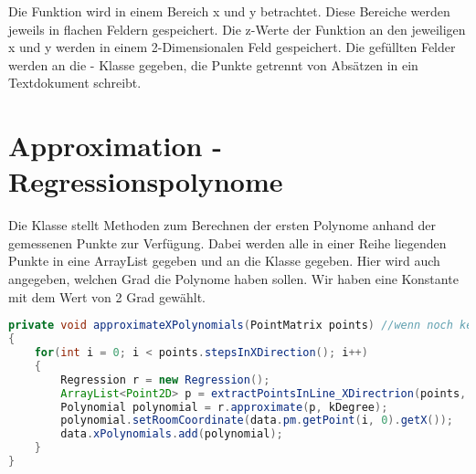 \documentclass[11pt, bibliography=totocnumbered]{scrartcl}
\begin{document}
Die Funktion wird in einem Bereich x und y betrachtet. Diese Bereiche werden jeweils in flachen Feldern gespeichert. Die z-Werte der Funktion an den jeweiligen x und y werden in einem 2-Dimensionalen Feld gespeichert.
Die gef\"ullten Felder werden an die \grqq - Klasse gegeben, die Punkte getrennt von Abs\"atzen in ein Textdokument schreibt.

\section{Approximation - Regressionspolynome}
Die Klasse  stellt Methoden zum Berechnen der ersten Polynome anhand der gemessenen Punkte zur Verf\"ugung. Dabei werden alle in einer Reihe liegenden Punkte in eine ArrayList gegeben und an die Klasse \grqq  gegeben. Hier wird auch angegeben, welchen Grad die Polynome haben sollen. Wir haben eine Konstante mit dem Wert von 2 Grad gew\"ahlt.


\begin{lstlisting}[caption={Polynome mit x als Raumkoordinate}, label={lst:label}, language=Java]
private void approximateXPolynomials(PointMatrix points) //wenn noch keine Stützpunkte vorhanden sind
{
	for(int i = 0; i < points.stepsInXDirection(); i++)
	{
		Regression r = new Regression();
		ArrayList<Point2D> p = extractPointsInLine_XDirectrion(points, i);
		Polynomial polynomial = r.approximate(p, kDegree);
		polynomial.setRoomCoordinate(data.pm.getPoint(i, 0).getX());
		data.xPolynomials.add(polynomial);
	}
}
\end{lstlisting}
\end{document}
